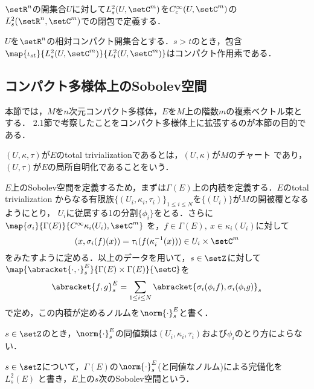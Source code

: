 \documentclass[uplatex,dvipdfmx]{jsarticle}
\newcommand{\sobolev}[1]{L^{2}_{#1}}
\newcommand{\sobolevlocal}[3]{\sobolev{#1}(\setR^{#2},\setC^{#3})}
\begin{document}
\begin{definition}
  $\setR^n$の開集合$U$に対して$\sobolev{s}(U,\setC^m)$を$C^\infty_c(U,\setC^m)$の
  $\sobolevlocal{s}{n}{m}$での閉包で定義する．
\end{definition}

\begin{theorem}[Rellichの補題]\label{Rellich lemma}
  $U$を$\setR^n$の相対コンパクト開集合とする．$s>t$のとき，包含
  $\map{\iota_{st}}{\sobolev{s}(U,\setC^m)}{\sobolev{t}(U,\setC^m)}$はコンパクト作用素である．
\end{theorem}

\subsection{コンパクト多様体上のSobolev空間}

本節では，$M$を$n$次元コンパクト多様体，$E$を$M$上の階数$m$の複素ベクトル束とする．
2.1節で考察したことをコンパクト多様体上に拡張するのが本節の目的である．

\begin{definition}
  $(U,\kappa,\tau)$が$E$のtotal trivializationであるとは，$(U,\kappa)$が$M$のチャート
  であり，$(U,\tau)$が$E$の局所自明化であることをいう．
\end{definition}

$E$上のSobolev空間を定義するため，まずは$\Gamma(E)$上の内積を定義する．$E$のtotal trivialization
からなる有限族$\{(U_i,\kappa_i,\tau_i)\}_{1\leq i \leq N}$を$\{(U_i)\}$が$M$の開被覆となるようにとり，
${U_i}$に従属する1の分割$\{\phi_i\}$をとる．さらに$\map{\sigma_i}{\Gamma(E)}{C^\infty{\kappa_i(U_i),\setC^m}}$
を，$f\in \Gamma(E),\ x\in \kappa_i(U_i)$に対して
\[ (x,\sigma_i(f)(x)) = \tau_i(f(\kappa_i^{-1}(x))) \in U_i\times \setC^m \]
をみたすように定める．以上のデータを用いて，$s\in \setZ$に対して$\map{\abracket{\cdot,\cdot}_s^E}{\Gamma(E)\times\Gamma(E)}{\setC}$を
\[ \abracket{f,g}^E_s=\sum_{1\leq i\leq N} \abracket{\sigma_i(\phi_i f),\sigma_i(\phi_i g)}_s \]
で定め，この内積が定めるノルムを$\norm{\cdot}^E_s$と書く．

\begin{proposition}
  $s\in\setZ$のとき，$\norm{\cdot}_s^E$の同値類は${(U_i,\kappa_i,\tau_i)}$および${\phi_i}$のとり方によらない．
\end{proposition}

\begin{definition}
  $s\in \setZ$について，$\Gamma(E)$の$\norm{\cdot}^E_s$(と同値なノルム)による完備化を$\sobolev{s}(E)$
  と書き，$E$上の$s$次のSobolev空間という．
\end{definition}
\end{document}
